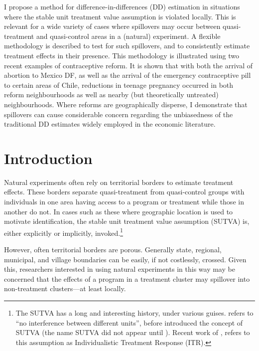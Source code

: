 \begin{chapabstract}
I propose a method for difference-in-differences (DD) estimation in situations 
where the stable unit treatment value assumption is violated locally. This is
relevant for a wide variety of cases where spillovers may occur between quasi-%
treatment and quasi-control areas in a (natural) experiment. A flexible 
methodology is described to test for such spillovers, and to consistently 
estimate treatment effects in their presence. This methodology is illustrated
using two recent examples of contraceptive reform.  It is shown that with both
the arrival of abortion to Mexico DF, as well as the arrival of the emergency
contraceptive pill to certain areas of Chile, reductions in teenage pregnancy
occurred in both reform neighbourhoods as well as nearby (but theoretically
untreated) neighbourhoods.  Where reforms are geographically disperse, I 
demonstrate that spillovers can cause considerable concern regarding the 
unbiasedness of the traditional DD estimates widely employed in the economic 
literature. \moreabst
\end{chapabstract}
\JELs
\newpage
\section{Introduction}
Natural experiments often rely on territorial borders to estimate treatment 
effects.  These borders separate quasi-treatment from quasi-control groups with
individuals in one area having access to a program or treatment while those in 
another do not.  In cases such as these where geographic location is used to 
motivate identification, the stable unit treatment value assumption (SUTVA) is, 
either explicitly or implicitly, invoked.\footnote{The SUTVA has a long and 
interesting history, under various guises. \citet{Cox1958} refers to ``no 
interference between different units'', before \citet{Rubin1978} introduced the 
concept of SUTVA (the name SUTVA did not appear until \citet{Rubin1980}).  
Recent work of \citet{Manski2013}, refers to this assumption as Individualistic 
Treatment Response (ITR).}

However, often territorial borders are porous.  Generally state, regional,
municipal, and village boundaries can be easily, if not costlessly, crossed.
Given this, researchers interested in using natural experiments in this way may
be concerned that the effects of a program in a treatment cluster may spillover 
into non-treatment clusters---at least locally.

